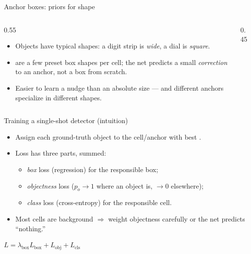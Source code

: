 \documentclass[10pt,aspectratio=169]{beamer}
\begin{document}
\begin{frame}{Anchor boxes: priors for shape}
  \begin{columns}[T]
    \begin{column}{0.55\textwidth}
      \begin{itemize}
        \item Objects have typical shapes: a digit strip is \emph{wide}, a dial is \emph{square}.
        \item {} are a few preset box shapes per cell; the net predicts a small \emph{correction} to an anchor, not a box from scratch.
        \item Easier to learn a nudge than an absolute size --- and different anchors specialize in different shapes.
      \end{itemize}
    \end{column}
    \begin{column}{0.45\textwidth}
      \begin{center}
      \end{center}
    \end{column}
  \end{columns}
\end{frame}

\begin{frame}{Training a single-shot detector (intuition)}
  \begin{itemize}
    \item Assign each ground-truth object to the cell/anchor with best .
    \item Loss has three parts, summed:
    \begin{itemize}
      \item \emph{box} loss (regression) for the responsible box;
      \item \emph{objectness} loss ($p_o\to1$ where an object is, $\to0$ elsewhere);
      \item \emph{class} loss (cross-entropy) for the responsible cell.
    \end{itemize}
    \item Most cells are background $\Rightarrow$ weight objectness carefully or the net predicts ``nothing.''
  \end{itemize}
  \begin{mathbox}
    $L = \lambda_{\text{box}}L_{\text{box}} + L_{\text{obj}} + L_{\text{cls}}$
  \end{mathbox}
\end{frame}
\end{document}
